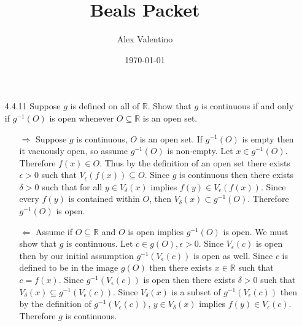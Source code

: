 \documentclass[12pt, letterpaper]{article}
\date{\today}
\author{Alex Valentino}
\title{Beals Packet}
\newcommand{\R}{\mathbb{R}}
\begin{document}
\begin{enumerate}
	\item[4.4.11] Suppose $g$ is defined on all of $\R$. Show that $g$ is continuous if and only if $g^{-1}(O)$ is open whenever $O \subseteq \R$ is an
open set.
	\begin{itemize}
		\item[$\Rightarrow$] Suppose $g$ is continuous, $O$ is an open set.  If $g^{-1}(O)$ is empty then it vacuously open, so assume $g^{-1}(O)$ is non-empty.  Let $x \in g^{-1}(O)$.  Therefore $f(x) \in O$.  Thus by the definition of an open set
		there exists $\epsilon > 0$ such that $V_\epsilon(f(x)) \subseteq O$.  Since $g$ is continuous then there exists 
		$\delta > 0$ such that for all $y \in V_\delta (x)$ implies $f(y) \in V_\epsilon(f(x))$.  Since every $f(y)$ is contained within $O$, then $ V_\delta (x) \subset g^{-1}(O)$.  Therefore $g^{-1}(O)$ is open.  
		\item[$\Leftarrow$] Assume if $O \subseteq \R$ and $O$ is open implies $g^{-1}(O)$ is open.  We must show that
		$g$ is continuous.  Let $c \in g(O), \epsilon > 0$.  Since $V_\epsilon(c)$ is open then by our initial assumption
		$g^{-1}(V_\epsilon(c))$ is open as well.  Since $c$ is defined to be in the image $g(O)$ then there exists 
		$x \in \R$ such that $c = f(x)$.  Since $g^{-1}(V_\epsilon(c))$ is open then there exists $\delta > 0$ such 
		that $V_\delta(x) \subseteq g^{-1}(V_\epsilon(c))$.  Since $V_\delta(x)$ is a subset of $g^{-1}(V_\epsilon(c))$
		then by the definition of $g^{-1}(V_\epsilon(c))$, $y \in V_\delta(x)$ implies $f(y) \in V_\epsilon(c)$.
		Therefore $g$ is continuous.  
	\end{itemize}

\end{enumerate}
\end{document}
